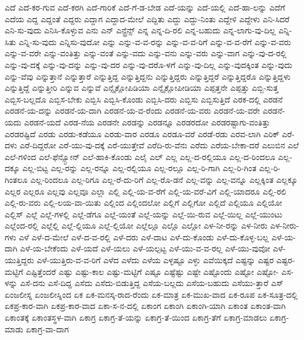 {ಎದೆ
ಎದೆ-ಕರ-ಗುವ
ಎದೆ-ಕರಗಿ
ಎದೆ-ಗಾರಿಕೆ
ಎದೆ-ಗೆ-ಡ-ಬೇಡ
ಎದೆ-ಯನ್ನು
ಎದೆ-ಯಲ್ಲಿ
ಎದೆ-ಹಾ-ಲನ್ನು
ಎದೆಗೆ
ಎದೆಯ
ಎದ್ದ
ಎದ್ದಂತೆ
ಎದ್ದರು
ಎದ್ದಾಗ
ಎದ್ದಾದ-ಮೇಲೆ
ಎದ್ದಿತು
ಎದ್ದು
ಎದ್ದು-ನಿಂತು
ಎದ್ದೇಳಿ
ಎದ್ದೇಳು
ಎನಿ-ಸಿದರೆ
ಎನಿ-ಸು-ವುದು
ಎನಿಸಿ-ಕೊಳ್ಳುವ
ಎನು
ಎನ್
ಎನ್ಟ್ರೆನ್ಸ್
ಎನ್ನ
ಎನ್ನ-ದಿ-ರಲಿ
ಎನ್ನ-ಬಹುದು
ಎನ್ನ-ಲಾಗು-ವು-ದಿಲ್ಲ
ಎನ್ನಿ-ಸಿತು
ಎನ್ನಿ-ಸು-ವುದು
ಎನ್ನಿಸು-ವುದೋ
ಎನ್ನು
ಎನ್ನು-ವ-ವ-ರನ್ನು
ಎನ್ನು-ವ-ವ-ರಿಗೆ
ಎನ್ನು-ವ-ವ-ರೆಗೆ
ಎನ್ನು-ವ-ವರು
ಎನ್ನು-ವ-ವರೇ
ಎನ್ನು-ವಂತಿತ್ತು
ಎನ್ನು-ವಂತೆ
ಎನ್ನು-ವದು
ಎನ್ನು-ವನು
ಎನ್ನು-ವರು
ಎನ್ನು-ವಾಗ
ಎನ್ನು-ವು-ದ-ರಲ್ಲಿ
ಎನ್ನು-ವು-ದಕ್ಕೆ
ಎನ್ನು-ವು-ದನ್ನು
ಎನ್ನು-ವು-ದರ
ಎನ್ನು-ವು-ದರೊ-ಳಗೆ
ಎನ್ನು-ವು-ದಿಲ್ಲ
ಎನ್ನು-ವುದಕ್ಕಿಂತ
ಎನ್ನು-ವುದು
ಎನ್ನು-ವೆವು
ಎನ್ನುತ್ತಾನೆ
ಎನ್ನುತ್ತಾರೆ
ಎನ್ನುತ್ತಿದ್ದ
ಎನ್ನುತ್ತಿದ್ದನು
ಎನ್ನುತ್ತಿದ್ದರು
ಎನ್ನುತ್ತಿದ್ದರೆ
ಎನ್ನುತ್ತಿದ್ದರೊ
ಎನ್ನುತ್ತಿದ್ದಳು
ಎನ್ನುತ್ತಿದ್ದೆ
ಎನ್ನುತ್ತೀರಿ
ಎನ್ನುವ
ಎನ್ನುವೆ
ಎನ್ಸೈಕ್ಲೋಪಿಡಿಯಾ
ಎನ್ಸೈಕ್ಲೋಪೀಡಿಯಾ
ಎಪ್ಪತ್ತನೇ
ಎಪ್ಪತ್ತು
ಎಬ್ಬಿ-ಸುತ್ತ
ಎಬ್ಬಿಸ-ಬಲ್ಲದೊ
ಎಬ್ಬಿಸ-ಬೇಕು
ಎಬ್ಬಿಸಿ
ಎಬ್ಬಿಸಿ-ಕೊಂಡು
ಎಬ್ಬಿಸಿ-ದರು
ಎಬ್ಬಿಸು
ಎಬ್ಬಿಸುತ್ತಿದೆ
ಎರಕ-ದಲ್ಲಿ
ಎರಡನೆ
ಎರಡನೆ-ಯ-ದನ್ನು
ಎರಡನೆ-ಯ-ದಾಗಿ
ಎರಡನೆ-ಯ-ವ-ರೆಂದು
ಎರಡನೆ-ಯ-ವರು
ಎರಡನೆ-ಯ-ವರೇ
ಎರಡನೆ-ಯದು
ಎರಡನೆ-ಯದೆ
ಎರಡ-ನೆಯ
ಎರಡನೇ
ಎರಡನ್ನು
ಎರಡನ್ನೂ
ಎರಡರದೋ
ಎರಡರಷ್ಟಾಗು-ವಂತಿತ್ತು
ಎರಡರಷ್ಟಿದೆ
ಎರಡು
ಎರಡು-ಕಡೆಯೂ
ಎರಡು-ವಾರ
ಎರಡೂ
ಎರಡೂ-ವರೆ
ಎರಡೆ-ರಡು
ಎರವ-ಲಾಗಿ
ಎರಿಕ್
ಎರೆ-ದಳು
ಎರೆ-ದಿದ್ದರೋ
ಎರೆ-ಯು-ವು-ದಕ್ಕೆ
ಎರೆ-ಯುತ್ತೇವೆ
ಎರೆದಿ-ರು-ವೆನು
ಎರೆದು
ಎರೆಯ-ಬೇಕಾ-ದರೆ
ಎಲುಬಿನ
ಎಲೆ
ಎಲೆ-ಗಳಿಂದ
ಎಲೆ-ಫೆನ್ಸ್ಟೋನ್
ಎಲೆ-ಹಾಕಿ-ಕೊಂಡು
ಎಲೈ
ಎಲ್
ಎಲ್ಲ
ಎಲ್ಲ-ದ-ರಲ್ಲಿಯೂ
ಎಲ್ಲ-ದ-ರಿಂದಲೂ
ಎಲ್ಲ-ದಕ್ಕೂ
ಎಲ್ಲ-ಬಿಟ್ಟ
ಎಲ್ಲ-ರನ್ನು
ಎಲ್ಲ-ರನ್ನೂ
ಎಲ್ಲ-ರಲ್ಲಿಯೂ
ಎಲ್ಲ-ರಲ್ಲೂ
ಎಲ್ಲ-ರಿ-ಗಾಗಿ
ಎಲ್ಲ-ರಿ-ಗಿಂತ
ಎಲ್ಲ-ರಿ-ಗಿಂತಲೂ
ಎಲ್ಲ-ರಿಂದಲೂ
ಎಲ್ಲ-ರಿಗೂ
ಎಲ್ಲ-ರೆ-ದು-ರಿಗೆ
ಎಲ್ಲ-ರೊ-ಡನೆ
ಎಲ್ಲ-ವನ್ನು
ಎಲ್ಲ-ವನ್ನೂ
ಎಲ್ಲಕ್ಕಿಂತ
ಎಲ್ಲಕ್ಕೂ
ಎಲ್ಲರ
ಎಲ್ಲರೂ
ಎಲ್ಲವು
ಎಲ್ಲವೂ
ಎಲ್ಲಾ
ಎಲ್ಲಿ
ಎಲ್ಲಿ-ಯ-ವ-ರೆಗೆ
ಎಲ್ಲಿ-ಯ-ವರೆ-ವಿಗೆ
ಎಲ್ಲಿ-ಯಾದರೂ
ಎಲ್ಲಿ-ರಲಿ
ಎಲ್ಲಿ-ರು-ವರು
ಎಲ್ಲಿ-ಲಯ-ವಾ-ಯಿತು
ಎಲ್ಲಿಂದ
ಎಲ್ಲಿಂದಲೋ
ಎಲ್ಲಿಗೆ
ಎಲ್ಲಿಗೋ
ಎಲ್ಲಿದೆ
ಎಲ್ಲಿಯೂ
ಎಲ್ಲಿಯೋ
ಎಲ್ಲಿಸ್
ಎಲ್ಲೆ
ಎಲ್ಲೆ-ಗಳಲ್ಲಿ
ಎಲ್ಲೆ-ಡೆಗೂ
ಎಲ್ಲೆ-ಯಂತೆ
ಎಲ್ಲೆ-ಯನ್ನು
ಎಲ್ಲೆ-ಯಿ-ರುವ
ಎಲ್ಲೆ-ಯಿಲ್ಲ
ಎಲ್ಲೆ-ಯುಂಟು
ಎಲ್ಲೆಂದ-ರಲ್ಲಿ
ಎಲ್ಲೆಲ್ಲಿ
ಎಲ್ಲೆ-ಲ್ಲಿಯೂ
ಎಲ್ಲೆ-ಲ್ಲಿಯೋ
ಎಲ್ಲೆಲ್ಲೂ
ಎಲ್ಲೊ
ಎಲ್ಲೋ
ಎಳ-ನೀ-ರನ್ನು
ಎಳ-ನೀರು
ಎಳ-ನೀರು-ಗಳು
ಎಳೆ
ಎಳೆ-ದ-ಮೇಲೆ
ಎಳೆ-ದ-ವ-ರಲ್ಲಿ
ಎಳೆ-ದರು
ಎಳೆ-ದಾಟ
ಎಳೆ-ದು-ಕೊಂಡು
ಎಳೆ-ದು-ಕೊಳ್ಳ-ಬಲ್ಲ
ಎಳೆ-ಯ-ದಾಗಿ
ಎಳೆ-ಯ-ಬೇಕೆಂದು
ಎಳೆ-ಯದೆ
ಎಳೆ-ಯಲು
ಎಳೆ-ಯಲ್ಪಟ್ಟ
ಎಳೆ-ಯು-ವ-ವ-ರಲ್ಲ
ಎಳೆ-ಯು-ವುವೋ
ಎಳೆ-ಯುತ್ತಿದ್ದರು
ಎಳೆ-ಯುತ್ತಿರು-ವ-ವ-ರಿಗೆ
ಎಳೆದ
ಎಳೆದು
ಎಳೆಯ
ಎಳ್ಳಷ್ಟೂ
ಎಳ್ಳು
ಎವೆಯಿಕ್ಕದೆ
ಎಷ್ಟನ್ನು
ಎಷ್ಟರ
ಎಷ್ಟರ-ಮಟ್ಟಿಗೆ
ಎಷ್ಟಿತ್ತೆಂದರೆ
ಎಷ್ಟು
ಎಷ್ಟು-ಕಾಲ
ಎಷ್ಟು-ಮಟ್ಟಿಗೆ
ಎಷ್ಟೂ
ಎಷ್ಟೆಷ್ಟು
ಎಷ್ಟೇ
ಎಷ್ಟೊಂದು
ಎಷ್ಟೋ
ಎಷ್ಟೋ-
ಎಸ-ಳನ್ನು
ಎಸೆ-ದನು
ಎಸೆ-ದಿದ್ದ
ಎಸೆದು
ಎಸೆದು-ಬಿಡುತ್ತಿದ್ದ
ಎಸೆಯ-ಬಲ್ಲದು
ಎಸೆಯ-ಬಹುದು
ಎಸೆಯು-ತ್ತಾರೆ
ಎಸ್
ಏಂಜಲೀಸ್ನ
ಏಂಜಲೀಸ್ನಿಂದ
ಏಕ
ಏಕ-ಮನಸ್ಕ-ರಾದ-ರೆಂದು
ಏಕ-ಮಾತ್ರ
ಏಕ-ಮುಖ-ವಾದ
ಏಕ-ರೂಪ
ಏಕ-ಸೂತ್ರ-ದಲ್ಲಿ
ಏಕಪ್ರ-ಕಾರ-ವಾಗಿ
ಏಕಪ್ರ-ಕಾರ-ವಾದ
ಏಕಾ-ಸ-ನ-ದಲ್ಲಿ
ಏಕಾಂಗ
ಏಕಾಂಗಿ
ಏಕಾಂಗಿ-ಯಾಗಿ
ಏಕಾಂತ
ಏಕಾಂತ-ವಾಗಿ
ಏಕಾಂತಕ್ಕೆ
ಏಕಾಂತಸ್ಥಳ-ವಾಗಿ
ಏಕಾಗ್ರ
ಏಕಾಗ್ರ-ತೆ-ಯನ್ನು
ಏಕಾಗ್ರ-ತೆ-ಯಿಂದ
ಏಕಾಗ್ರ-ತೆಗೆ
ಏಕಾಗ್ರ-ಮಾಡಲು
ಏಕಾಗ್ರ-ಮಾಡು
ಏಕಾಗ್ರ-ವಾ-ದಾಗ
}
